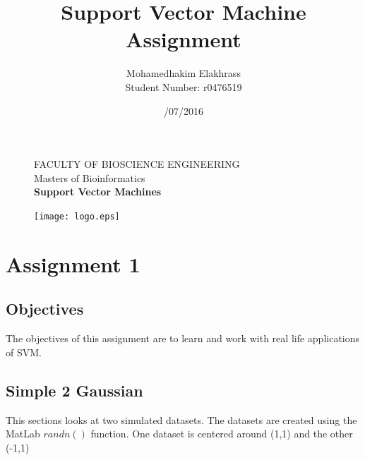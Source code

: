 \documentclass[11pt,oneside,a4paper]{article}
\title{\vspace*{40.0mm}
  \bf\sf Support Vector Machine Assignment 
         \vspace*{20.0mm} \\
  \vspace*{40.0mm}
  }
\author{\sf Mohamedhakim Elakhrass \\ Student Number: r0476519}
\date{\sf 15/07/2016}
\makeatletter
\def\cleardoublepage{\clearpage\if@twoside \ifodd\c@page\else%
\hbox{}%
\thispagestyle{empty}%
\clearpage%
\if@twocolumn\hbox{}\clearpage\fi\fi\fi}
\makeatother
\begin{document}
	
	
\begin{figure}
  \parbox[t]{125mm}{
    \vspace*{6mm}
    \scriptsize\sf           FACULTY OF BIOSCIENCE ENGINEERING\\
    \scriptsize\sf           Masters of Bioinformatics \\
    \scriptsize\sf\bfseries  Support Vector Machines \\}
  \parbox[t]{40mm}{
    \begin{flushright}
      \texttt{[image: logo.eps]}
    \end{flushright}}
\end{figure}

\maketitle
\thispagestyle{empty}
\raggedbottom

\cleardoublepage
{}
\setcounter{tocdepth}{2}
\tableofcontents
\cleardoublepage
{}

\cleardoublepage

\section{Assignment 1}
\subsection{Objectives}
The objectives of this assignment are to learn and work with real life applications of SVM. 
\subsection{Simple 2 Gaussian}
This sections looks at two simulated datasets. The datasets are created using the MatLab $randn()$ function. One dataset is centered around (1,1) and the other (-1,1)\\
\end{document}
